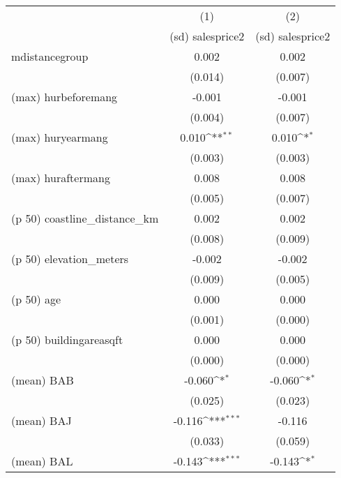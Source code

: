 {
\def\sym#1{\ifmmode^{#1}\else\(^{#1}\)\fi}
\begin{tabular}{l*{2}{c}}
\hline\hline
                    &\multicolumn{1}{c}{(1)}&\multicolumn{1}{c}{(2)}\\
                    &\multicolumn{1}{c}{(sd) salesprice2}&\multicolumn{1}{c}{(sd) salesprice2}\\
\hline
mdistancegroup      &       0.002         &       0.002         \\
                    &     (0.014)         &     (0.007)         \\
[1em]
(max) hurbeforemang &      -0.001         &      -0.001         \\
                    &     (0.004)         &     (0.007)         \\
[1em]
(max) huryearmang   &       0.010\sym{**} &       0.010\sym{*}  \\
                    &     (0.003)         &     (0.003)         \\
[1em]
(max) huraftermang  &       0.008         &       0.008         \\
                    &     (0.005)         &     (0.007)         \\
[1em]
(p 50) coastline\_distance\_km&       0.002         &       0.002         \\
                    &     (0.008)         &     (0.009)         \\
[1em]
(p 50) elevation\_meters&      -0.002         &      -0.002         \\
                    &     (0.009)         &     (0.005)         \\
[1em]
(p 50) age          &       0.000         &       0.000         \\
                    &     (0.001)         &     (0.000)         \\
[1em]
(p 50) buildingareasqft&       0.000         &       0.000         \\
                    &     (0.000)         &     (0.000)         \\
[1em]
(mean) BAB          &      -0.060\sym{*}  &      -0.060\sym{*}  \\
                    &     (0.025)         &     (0.023)         \\
[1em]
(mean) BAJ          &      -0.116\sym{***}&      -0.116         \\
                    &     (0.033)         &     (0.059)         \\
[1em]
(mean) BAL          &      -0.143\sym{***}&      -0.143\sym{*}  \\

\end{tabular}}
